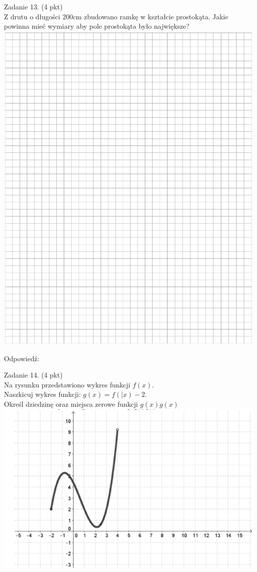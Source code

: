 \documentclass[10pt]{article}
\begin{document}
Zadanie 13. (4 pkt)\\
Z drutu o długości 200cm zbudowano ramkę w kształcie prostokąta. Jakie powinna mieć wymiary aby pole prostokąta było największe?\\
\includegraphics[max width=\textwidth, center]{2024_11_21_caad0d2d07cc5c30818fg-11}

Odpowiedź:

Zadanie 14. (4 pkt)\\
Na rysunku przedstawiono wykres funkcji \(f(x)\).\\
Naszkicuj wykres funkcji: \(g(x)=f(\mid x)-2\).\\
Określ dziedzinę oraz miejsca zerowe funkcji \(g(x) g(x)\)\\
\includegraphics[max width=\textwidth, center]{2024_11_21_caad0d2d07cc5c30818fg-12}
\end{document}
